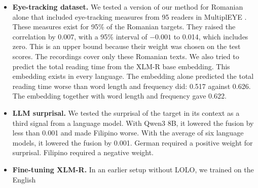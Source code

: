 \begin{itemize}
\item \textbf{Eye-tracking dataset.} We tested a version of our method for Romanian alone that %
included eye-tracking measures from 95 readers in MultiplEYE \citep{jakobi-etal-2025-multipleye}. %
These measures exist for 95\% of the Romanian targets. They raised the correlation by 0.007, with a %
95\% interval of $-0.001$ to 0.014, which includes zero. This is an upper bound because their %
weight was chosen on the test scores. The recordings cover only these Romanian texts. We also tried %
to predict the total reading time from the XLM-R base embedding. This embedding exists in every %
language. The embedding alone predicted the total reading time worse than word length and frequency
did: 0.517 against 0.626. The embedding together with word length and frequency gave 0.622. %
\item \textbf{LLM surprisal.} We tested the surprisal of the target in its context as a third %
signal from a language model. With Qwen3 8B, it lowered the fusion by less than 0.001 and made %
Filipino worse. With the average of six language models, it lowered the fusion by 0.001. German %
required a positive weight for surprisal. Filipino required a negative weight. %
\item \textbf{Fine-tuning XLM-R.} In an earlier setup without LOLO, we trained on the English %

\end{itemize}
